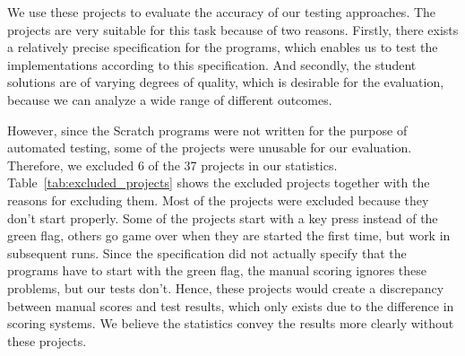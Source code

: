 We use these projects to evaluate the accuracy of our testing approaches.
The projects are very suitable for this task because of two reasons.
Firstly, there exists a relatively precise specification for the programs,
which enables us to test the implementations according to this specification.
And secondly, the student solutions are of varying degrees of quality,
which is desirable for the evaluation,
because we can analyze a wide range of different outcomes.
\parspace

However, since the Scratch programs were not written for the purpose of automated testing,
some of the projects were unusable for our evaluation.
Therefore, we excluded $6$ of the 37 projects in our statistics.
Table~\ref{tab:excluded_projects} shows the excluded projects together with the reasons for excluding them.
Most of the projects were excluded because they don't start properly.
Some of the projects start with a key press instead of the green flag,
others go game over when they are started the first time, but work in subsequent runs.
Since the specification did not actually specify that the programs have to start with the green flag,
the manual scoring ignores these problems, but our tests don't.
Hence, these projects would create a discrepancy between manual scores and test results,
which only exists due to the difference in scoring systems.
We believe the statistics convey the results more clearly without these projects.

